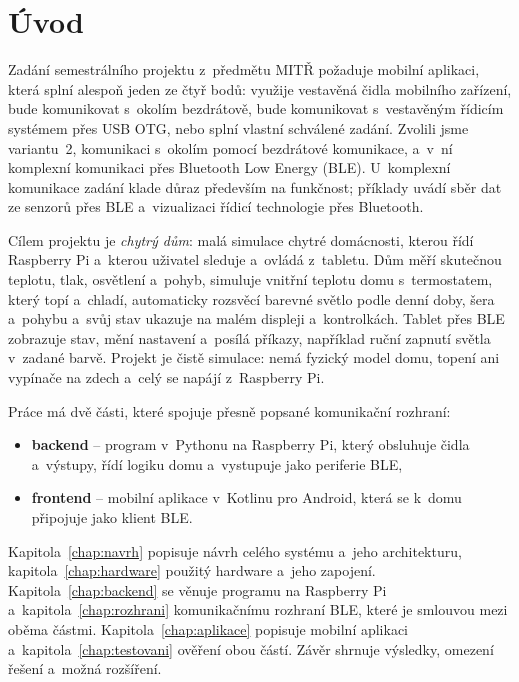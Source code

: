 \chapter{Úvod}
\label{chap:uvod}

Zadání semestrálního projektu z~předmětu MITŘ požaduje mobilní aplikaci, která splní alespoň
jeden ze čtyř bodů: využije vestavěná čidla mobilního zařízení, bude komunikovat s~okolím
bezdrátově, bude komunikovat s~vestavěným řídicím systémem přes USB OTG, nebo splní vlastní
schválené zadání. Zvolili jsme variantu~2, komunikaci s~okolím pomocí bezdrátové komunikace,
a~v~ní komplexní komunikaci přes Bluetooth Low Energy (BLE). U~komplexní komunikace zadání
klade důraz především na funkčnost; příklady uvádí sběr dat ze senzorů přes BLE a~vizualizaci
řídicí technologie přes Bluetooth.

Cílem projektu je \emph{chytrý dům}: malá simulace chytré domácnosti, kterou řídí Raspberry Pi
a~kterou uživatel sleduje a~ovládá z~tabletu. Dům měří skutečnou teplotu, tlak, osvětlení
a~pohyb, simuluje vnitřní teplotu domu s~termostatem, který topí a~chladí, automaticky rozsvěcí
barevné světlo podle denní doby, šera a~pohybu a~svůj stav ukazuje na malém displeji
a~kontrolkách. Tablet přes BLE zobrazuje stav, mění nastavení a~posílá příkazy, například
ruční zapnutí světla v~zadané barvě. Projekt je čistě simulace: nemá fyzický model domu,
topení ani vypínače na zdech a~celý se napájí z~Raspberry Pi.

Práce má dvě části, které spojuje přesně popsané komunikační rozhraní:
\begin{itemize}
  \item \textbf{backend} -- program v~Pythonu na Raspberry Pi, který obsluhuje čidla a~výstupy,
        řídí logiku domu a~vystupuje jako periferie BLE,
  \item \textbf{frontend} -- mobilní aplikace v~Kotlinu pro Android, která se k~domu připojuje
        jako klient BLE.
\end{itemize}

Kapitola~\ref{chap:navrh} popisuje návrh celého systému a~jeho architekturu,
kapitola~\ref{chap:hardware} použitý hardware a~jeho zapojení. Kapitola~\ref{chap:backend} se
věnuje programu na Raspberry Pi a~kapitola~\ref{chap:rozhrani} komunikačnímu rozhraní BLE, které
je smlouvou mezi oběma částmi. Kapitola~\ref{chap:aplikace} popisuje mobilní aplikaci
a~kapitola~\ref{chap:testovani} ověření obou částí. Závěr shrnuje výsledky, omezení řešení
a~možná rozšíření.
